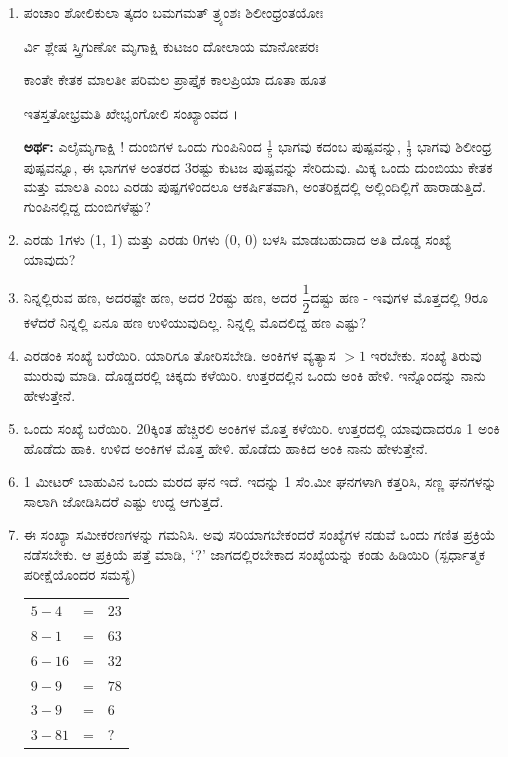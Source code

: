 \begin{enumerate}
\item ಪಂಚಾಂ ಶೋಲಿಕುಲಾ ತ್ಕದಂ ಬಮಗಮತ್ ತ್ರ್ಯಂಶಃ ಶಿಲೀಂಧ್ರಂತಯೋಃ 

ರ್ವಿ ಶ್ಲೇಷ ಸ್ತ್ರಿಗುಣೋ ಮೃಗಾಕ್ಷಿ ಕುಟಜಂ ದೋಲಾಯ ಮಾನೋಪರಃ 

ಕಾಂತೇ ಕೇತಕ ಮಾಲತೀ ಪರಿಮಲ ಪ್ರಾಪ್ತೈಕ ಕಾಲಪ್ರಿಯಾ ದೂತಾ ಹೂತ 

ಇತಸ್ತತೋಭ್ರಮತಿ ಖೇಭೃಂಗೋಲಿ ಸಂಖ್ಯಾಂವದ ।


\vskip 0.2cm

{\bf ಅರ್ಥ:} ಎಲೈಮೃಗಾಕ್ಷಿ ! ದುಂಬಿಗಳ ಒಂದು ಗುಂಪಿನಿಂದ $\frac{1}{5}$ ಭಾಗವು ಕದಂಬ ಪುಷ್ಪವನ್ನು, $\frac{1}{3}$ ಭಾಗವು ಶಿಲೀಂಧ್ರ ಪುಷ್ಪವನ್ನೂ, ಈ ಭಾಗಗಳ ಅಂತರದ 3ರಷ್ಟು ಕುಟಜ ಪುಷ್ಪವನ್ನು ಸೇರಿದುವು. ಮಿಕ್ಕ ಒಂದು ದುಂಬಿಯು ಕೇತಕ ಮತ್ತು ಮಾಲತಿ ಎಂಬ ಎರಡು ಪುಷ್ಪಗಳಿಂದಲೂ ಆಕರ್ಷಿತವಾಗಿ, ಅಂತರಿಕ್ಷದಲ್ಲಿ ಅಲ್ಲಿಂದಿಲ್ಲಿಗೆ ಹಾರಾಡುತ್ತಿದೆ. ಗುಂಪಿನಲ್ಲಿದ್ದ ದುಂಬಿಗಳೆಷ್ಟು?  

\item ಎರಡು 1ಗಳು (1, 1) ಮತ್ತು ಎರಡು 0ಗಳು (0, 0) ಬಳಸಿ ಮಾಡಬಹುದಾದ ಅತಿ ದೊಡ್ಡ ಸಂಖ್ಯೆ ಯಾವುದು? 

\item ನಿನ್ನಲ್ಲಿರುವ ಹಣ, ಅದರಷ್ಟೇ ಹಣ, ಅದರ 2ರಷ್ಟು ಹಣ, ಅದರ $\dfrac{1}{2}$ದಷ್ಟು ಹಣ - ಇವುಗಳ ಮೊತ್ತದಲ್ಲಿ 9ರೂ ಕಳೆದರೆ ನಿನ್ನಲ್ಲಿ ಏನೂ ಹಣ ಉಳಿಯುವುದಿಲ್ಲ. ನಿನ್ನಲ್ಲಿ ಮೊದಲಿದ್ದ ಹಣ ಎಷ್ಟು? 

\item ಎರಡಂಕಿ ಸಂಖ್ಯೆ ಬರೆಯಿರಿ. ಯಾರಿಗೂ ತೋರಿಸಬೇಡಿ. ಅಂಕಿಗಳ ವ್ಯತ್ಯಾಸ $> 1$ ಇರಬೇಕು. ಸಂಖ್ಯೆ ತಿರುವು ಮುರುವು ಮಾಡಿ. ದೊಡ್ಡದರಲ್ಲಿ ಚಿಕ್ಕದು ಕಳೆಯಿರಿ. ಉತ್ತರದಲ್ಲಿನ ಒಂದು ಅಂಕಿ ಹೇಳಿ. ಇನ್ನೊಂದನ್ನು ನಾನು ಹೇಳುತ್ತೇನೆ. 

\item ಒಂದು ಸಂಖ್ಯೆ ಬರೆಯಿರಿ. 20ಕ್ಕಿಂತ ಹೆಚ್ಚಿರಲಿ ಅಂಕಿಗಳ ಮೊತ್ತ ಕಳೆಯಿರಿ. ಉತ್ತರದಲ್ಲಿ ಯಾವುದಾದರೂ 1 ಅಂಕಿ ಹೊಡೆದು ಹಾಕಿ. ಉಳಿದ ಅಂಕಿಗಳ ಮೊತ್ತ ಹೇಳಿ. ಹೊಡೆದು ಹಾಕಿದ ಅಂಕಿ ನಾನು ಹೇಳುತ್ತೇನೆ. 

\item 1 ಮೀಟರ್ ಬಾಹುವಿನ ಒಂದು ಮರದ ಘನ ಇದೆ. ಇದನ್ನು 1 ಸೆಂ.ಮೀ ಘನಗಳಾಗಿ  ಕತ್ತರಿಸಿ, ಸಣ್ಣ ಘನಗಳನ್ನು ಸಾಲಾಗಿ ಜೋಡಿಸಿದರೆ ಎಷ್ಟು ಉದ್ದ ಆಗುತ್ತದೆ. 

\item ಈ ಸಂಖ್ಯಾ ಸಮೀಕರಣಗಳನ್ನು ಗಮನಿಸಿ. ಅವು ಸರಿಯಾಗಬೇಕಂದರೆ ಸಂಖ್ಯೆಗಳ ನಡುವೆ ಒಂದು ಗಣಿತ ಪ್ರಕ್ರಿಯೆ ನಡೆಸಬೇಕು. ಆ ಪ್ರಕ್ರಿಯೆ ಪತ್ತೆ ಮಾಡಿ, `?' ಜಾಗದಲ್ಲಿರಬೇಕಾದ ಸಂಖ್ಯೆಯನ್ನು ಕಂಡು ಹಿಡಿಯಿರಿ (ಸ್ಪರ್ಧಾತ್ಮಕ ಪರೀಕ್ಷೆ\break ಯೊಂದರ ಸಮಸ್ಯೆ)

\begin{tabular}[t]{l@{\;}c@{\;}l}
$5-4$ & = & $23$\\
$8-1$ & = & $63$\\
$6-16$ & = & $32$\\
$9-9$ & = & $78$\\
$3-9$ & = & $6$\\
$3-81$ & = & $?$
\end{tabular}


\end{enumerate}
